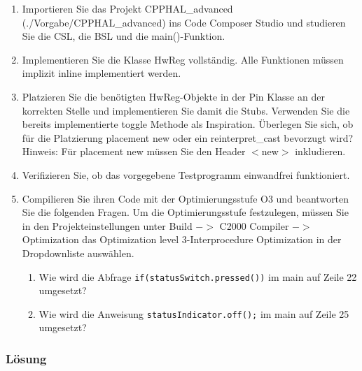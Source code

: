 \begin{enumerate}
  \item Importieren Sie das Projekt CPPHAL\_advanced (./Vorgabe/CPPHAL\_advanced) ins Code Composer Studio und studieren Sie die CSL, die BSL und die main()-Funktion.
  \item Implementieren Sie die Klasse HwReg vollständig. Alle Funktionen müssen implizit inline implementiert werden.
  \item Platzieren Sie die benötigten HwReg-Objekte in der Pin Klasse an der korrekten Stelle und implementieren Sie damit die Stubs. Verwenden Sie die bereits implementierte toggle Methode als Inspiration. Überlegen Sie sich, ob für die Platzierung placement new oder ein reinterpret\_cast bevorzugt wird? Hinweis: Für placement new müssen Sie den Header $<$new$>$ inkludieren.
  \item Verifizieren Sie, ob das vorgegebene Testprogramm einwandfrei funktioniert.
  \item Compilieren Sie ihren Code mit der Optimierungsstufe O3 und beantworten Sie die folgenden Fragen. Um die Optimierungsstufe festzulegen, müssen Sie in den Projekteinstellungen unter Build $->$ C2000 Compiler $->$ Optimization das Optimization level 3-Interprocedure Optimization in der Dropdownliste auswählen.
  \begin{enumerate}
    \item Wie wird die Abfrage \texttt{if(statusSwitch.pressed())} im main auf Zeile 22 umgesetzt?
    \item Wie wird die Anweisung \texttt{statusIndicator.off();} im main auf Zeile 25 umgesetzt?
  \end{enumerate}
\end{enumerate}

\subsubsection{Lösung}

